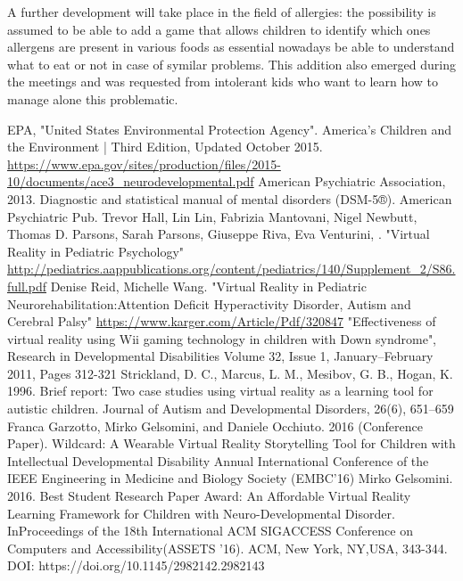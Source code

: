 \documentclass{sigchi-ext}
\begin{document}
A further development will take place in the field of allergies: the possibility is assumed to be able to add a game that allows children to identify which ones allergens are present in various foods as essential nowadays be able to understand what to eat or not in case of symilar problems. This addition also emerged during the meetings and was requested from intolerant kids who want to learn how to manage alone this problematic.


\renewcommand\refname{}
\begin{thebibliography}{100}
 EPA, "United States Environmental Protection Agency". America's Children and the Environment | Third Edition, Updated October 2015. 
\url{https://www.epa.gov/sites/production/files/2015-10/documents/ace3_neurodevelopmental.pdf}
 American Psychiatric Association, 2013. Diagnostic and statistical manual of mental disorders (DSM-5®). American Psychiatric Pub. 
 Trevor Hall, Lin Lin, Fabrizia Mantovani, Nigel Newbutt, Thomas D. Parsons, Sarah Parsons, Giuseppe Riva, Eva Venturini, . "Virtual Reality in Pediatric Psychology"
\url{http://pediatrics.aappublications.org/content/pediatrics/140/Supplement_2/S86.full.pdf}
 Denise Reid, Michelle Wang. "Virtual Reality in Pediatric Neurorehabilitation:Attention Deficit Hyperactivity Disorder, Autism and Cerebral Palsy"
\url{https://www.karger.com/Article/Pdf/320847} 
 "Effectiveness of virtual reality using Wii gaming technology in children with Down syndrome", Research in Developmental Disabilities Volume 32, Issue 1, January–February 2011, Pages 312-321
 Strickland, D. C., Marcus, L. M., Mesibov, G. B., Hogan, K. 1996. Brief report: Two case studies using virtual reality as a learning tool for autistic children. Journal of Autism and Developmental Disorders, 26(6), 651–659
 Franca Garzotto, Mirko Gelsomini, and Daniele Occhiuto. 2016 (Conference Paper). Wildcard: A Wearable Virtual Reality Storytelling Tool for Children with Intellectual Developmental Disability Annual International Conference of the IEEE Engineering in Medicine and Biology Society (EMBC’16)
 Mirko Gelsomini. 2016. Best Student Research Paper Award: An Affordable Virtual Reality Learning Framework for Children with Neuro-Developmental Disorder. InProceedings of the 18th International ACM SIGACCESS Conference on Computers and Accessibility(ASSETS '16). ACM, New York, NY,USA, 343-344. DOI: https://doi.org/10.1145/2982142.2982143
\end{thebibliography}

\balance{} 
%
%
\end{document}
